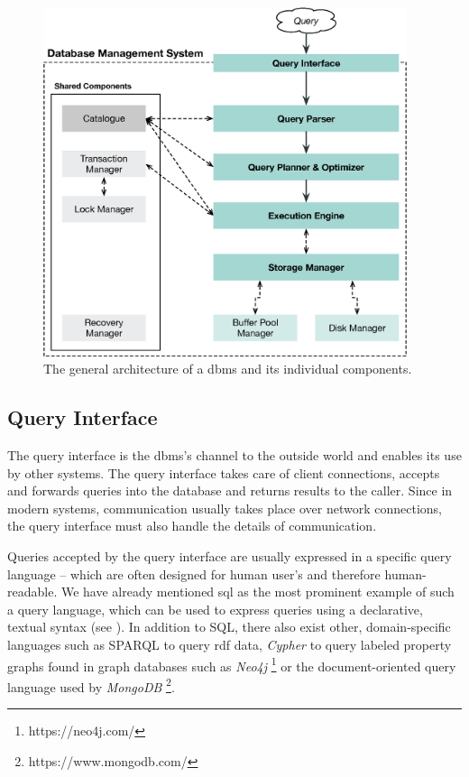 \begin{figure}[tb]
    \centering
    \includegraphics[width=0.95\textwidth]{figures/dbms-architecture.eps}
    \caption{The general architecture of a \acrshort{dbms} and its individual components.}
    \label{figure:dbms-architecture}
\end{figure}

\subsection{Query Interface}

The query interface is the \acrshort{dbms}'s channel to the outside world and enables its use by other systems. The query interface takes care of client connections, accepts and forwards queries into the database and returns results to the caller. Since in modern systems, communication usually takes place over network connections, the query interface must also handle the details of communication.

Queries accepted by the query interface are usually expressed in a specific query language -- which are often designed for human user's and therefore human-readable. We have already mentioned \acrshort{sql} \cite{Chamberlin:2012Early} as the most prominent example of such a query language, which can be used to express queries using a declarative, textual syntax (see ). In addition to SQL, there also exist other, domain-specific languages such as SPARQL \cite{Perez:2009Semantics} to query \acrfull{rdf} data, \emph{Cypher} to query labeled property graphs \cite{Francis:2018Cypher} found in graph databases such as \emph{Neo4j} \footnote{https://neo4j.com/} or the document-oriented query language used by \emph{MongoDB} \footnote{https://www.mongodb.com/}.

